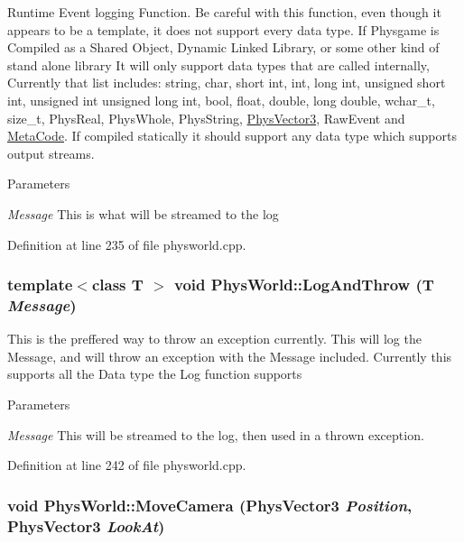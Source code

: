Runtime Event logging Function. Be careful with this function, even though it appears to be a template, it does not support every data type. If Physgame is Compiled as a Shared Object, Dynamic Linked Library, or some other kind of stand alone library It will only support data types that are called internally, Currently that list includes: string, char, short int, int, long int, unsigned short int, unsigned int unsigned long int, bool, float, double, long double, wchar\_\-t, size\_\-t, PhysReal, PhysWhole, PhysString, \hyperlink{classPhysVector3}{PhysVector3}, RawEvent and \hyperlink{classMetaCode}{MetaCode}. If compiled statically it should support any data type which supports output streams. 
\begin{DoxyParams}{Parameters}
\item[{\em Message}]This is what will be streamed to the log \end{DoxyParams}


Definition at line 235 of file physworld.cpp.\hypertarget{classPhysWorld_a1c2aeaed2a89821a4545db854da33ab8}{
\subsubsection[{LogAndThrow}]{\setlength{\rightskip}{0pt plus 5cm}template$<$class T $>$ void PhysWorld::LogAndThrow (T {\em Message})}}
\label{db/df5/classPhysWorld_a1c2aeaed2a89821a4545db854da33ab8}


This is the preffered way to throw an exception currently. This will log the Message, and will throw an exception with the Message included. Currently this supports all the Data type the Log function supports 
\begin{DoxyParams}{Parameters}
\item[{\em Message}]This will be streamed to the log, then used in a thrown exception. \end{DoxyParams}


Definition at line 242 of file physworld.cpp.\hypertarget{classPhysWorld_a1df24ee06d5881825902b60e0d81174a}{
\subsubsection[{MoveCamera}]{\setlength{\rightskip}{0pt plus 5cm}void PhysWorld::MoveCamera ({\bf PhysVector3} {\em Position}, \/  {\bf PhysVector3} {\em LookAt})}}
\label{db/df5/classPhysWorld_a1df24ee06d5881825902b60e0d81174a}


